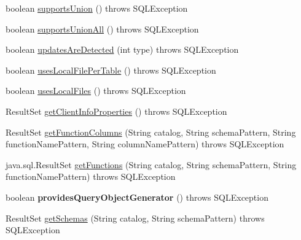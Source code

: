 \begin{DoxyCompactItemize}
\item 
boolean \mbox{\hyperlink{classcom_1_1mysql_1_1jdbc_1_1_database_meta_data_ada9b430a38cf202e873a20eeb93613d2}{supports\+Union}} ()  throws S\+Q\+L\+Exception 
\item 
boolean \mbox{\hyperlink{classcom_1_1mysql_1_1jdbc_1_1_database_meta_data_aa427bf7fc40cc3eaf41dff0398592c52}{supports\+Union\+All}} ()  throws S\+Q\+L\+Exception 
\item 
boolean \mbox{\hyperlink{classcom_1_1mysql_1_1jdbc_1_1_database_meta_data_a59dee4ec20a09deed13ec6efcbe5a0dd}{updates\+Are\+Detected}} (int type)  throws S\+Q\+L\+Exception 
\item 
boolean \mbox{\hyperlink{classcom_1_1mysql_1_1jdbc_1_1_database_meta_data_a2bf73a779c229a6101ae507f2af18f67}{uses\+Local\+File\+Per\+Table}} ()  throws S\+Q\+L\+Exception 
\item 
boolean \mbox{\hyperlink{classcom_1_1mysql_1_1jdbc_1_1_database_meta_data_aa41bf75fed6b9c41ac793b9a06e6cad8}{uses\+Local\+Files}} ()  throws S\+Q\+L\+Exception 
\item 
Result\+Set \mbox{\hyperlink{classcom_1_1mysql_1_1jdbc_1_1_database_meta_data_ae8da111ec67e4ebf46a2c82127ccaeff}{get\+Client\+Info\+Properties}} ()  throws S\+Q\+L\+Exception 
\item 
Result\+Set \mbox{\hyperlink{classcom_1_1mysql_1_1jdbc_1_1_database_meta_data_ac3dfe62ad76ecff89524d11761f24a11}{get\+Function\+Columns}} (String catalog, String schema\+Pattern, String function\+Name\+Pattern, String column\+Name\+Pattern)  throws S\+Q\+L\+Exception 
\item 
java.\+sql.\+Result\+Set \mbox{\hyperlink{classcom_1_1mysql_1_1jdbc_1_1_database_meta_data_a01609207bf0f104ae316e507c1250ec5}{get\+Functions}} (String catalog, String schema\+Pattern, String function\+Name\+Pattern)  throws S\+Q\+L\+Exception 
\item 
\mbox{\label{classcom_1_1mysql_1_1jdbc_1_1_database_meta_data_a1a3560d04278ed749472c917912d9244}} 
boolean {\bfseries provides\+Query\+Object\+Generator} ()  throws S\+Q\+L\+Exception 
\item 
Result\+Set \mbox{\hyperlink{classcom_1_1mysql_1_1jdbc_1_1_database_meta_data_a63676aa9cfd3aed41c908397d59445d6}{get\+Schemas}} (String catalog, String schema\+Pattern)  throws S\+Q\+L\+Exception 
\item 
\mbox{\label{classcom_1_1mysql_1_1jdbc_1_1_database_meta_data_a11f9a72a1a1a73338ae02bc47784f888}} 

\end{DoxyCompactItemize}

